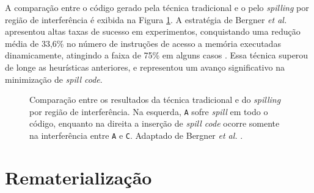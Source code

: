 \documentclass[
	12pt,				%
	openright,			%
	twoside,			%
	a4paper,			%
	tcc,			%
	]{ABNT-DC-UEL}
\begin{document}
A comparação entre o código gerado pela técnica tradicional e o pelo \textit{spilling} por região de interferência é exibida na Figura \ref{fig:bergner-comparacao}. A estratégia de Bergner \textit{et al.} apresentou altas taxas de sucesso em experimentos, conquistando uma redução média de 33,6\% no número de instruções de acesso a memória executadas dinamicamente, atingindo a faixa de 75\% em alguns casos \cite{bergner:97}. Essa técnica superou de longe as heurísticas anteriores, e representou um avanço significativo na minimização de \textit{spill code}. 

\begin{figure}[H]
    \centering
    \begin{subfigure}{0.49\textwidth}
        \centering
    \end{subfigure}
    \begin{subfigure}{0.49\textwidth}
        \centering
    \end{subfigure}
    \caption{Comparação entre os resultados da técnica tradicional e do \textit{spilling} por região de interferência. Na esquerda, \texttt{A} sofre \textit{spill} em todo o código, enquanto na direita a inserção de \textit{spill code} ocorre somente na interferência entre \texttt{A} e \texttt{C}. Adaptado de Bergner \textit{et al.} \cite{bergner:97}.}
    \label{fig:bergner-comparacao}
\end{figure}

\section{Rematerialização}
\end{document}

